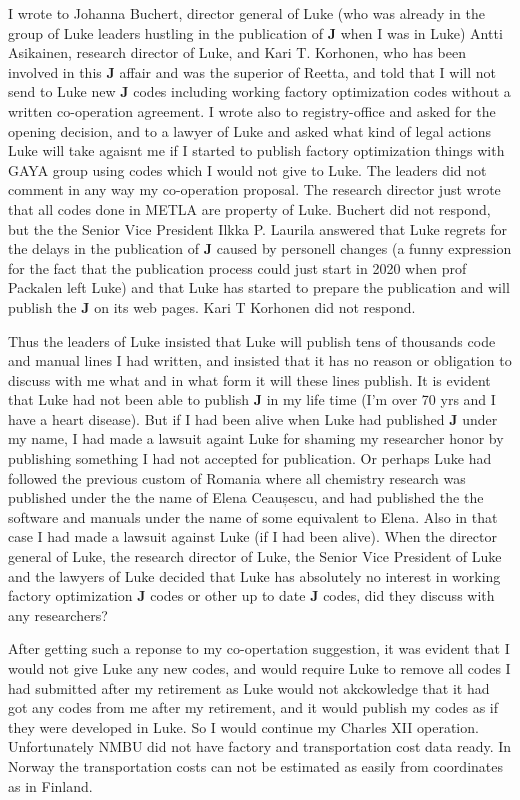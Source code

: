 I wrote to Johanna Buchert, director general of Luke (who was already in the group of
Luke leaders hustling in the publication of \textbf{J} when I was in Luke)
Antti Asikainen, research director of Luke,  and Kari T. Korhonen, who has
been involved in this \textbf{J} affair and was the superior of Reetta, and
told that I will not send to Luke new \textbf{J} codes including working
factory optimization codes without a written co-operation agreement.
I wrote also to registry-office and asked for the opening decision, and
to a lawyer of Luke and asked what kind of legal actions
Luke will take agaisnt me if I started to publish factory optimization
things with GAYA group using codes which I would not give to Luke.
The leaders did not comment in any way my co-operation proposal. The research director
just wrote that
all codes done in METLA are property of Luke. Buchert did not respond, but
the the Senior Vice President Ilkka P. Laurila answered that Luke regrets
for the delays in the publication of \textbf{J} caused by personell changes
(a funny expression for the fact that the publication process
could just start in 2020
when prof Packalen left Luke)
and
that Luke has started to prepare the publication and will publish the \textbf{J} on its
web pages. Kari T Korhonen did not respond.

Thus the leaders of Luke insisted that Luke will publish tens of thousands code
and manual lines I had written, and insisted that it has no reason
or obligation to discuss with
me what and in what form it will these lines publish.
It is evident that Luke had not been able to publish
\textbf{J} in my life time (I'm over 70 yrs and I have a heart disease).
But if I had been alive when Luke had
published \textbf{J} under my name, I had made a lawsuit againt Luke
for shaming my researcher honor
by publishing something I had not accepted for publication. Or perhaps
Luke had followed
the previous  custom of  Romania where all chemistry
research was published under the the name of Elena Ceaușescu,
and had published the the software and
manuals under the name of some equivalent to Elena.
Also in that case I had made a lawsuit
against Luke (if I had been alive). When the director general of Luke,
the research director of Luke, the Senior Vice President of Luke
and the lawyers of Luke
decided that Luke has absolutely no interest in
working factory optimization \textbf{J} codes or
other up to date \textbf{J} codes, did they discuss with any researchers?

After getting such a reponse to my co-opertation suggestion, it was evident that
I would not give Luke any new codes, and would require Luke to remove all codes I had
submitted after my retirement as Luke would not akckowledge that
it had got any codes from me after my retirement, and it would publish my codes
as if they were developed in Luke. So I would continue my Charles XII operation.
Unfortunately NMBU did not have factory and transportation cost data ready.  In Norway
the transportation costs can not be estimated as easily from coordinates as in Finland.

